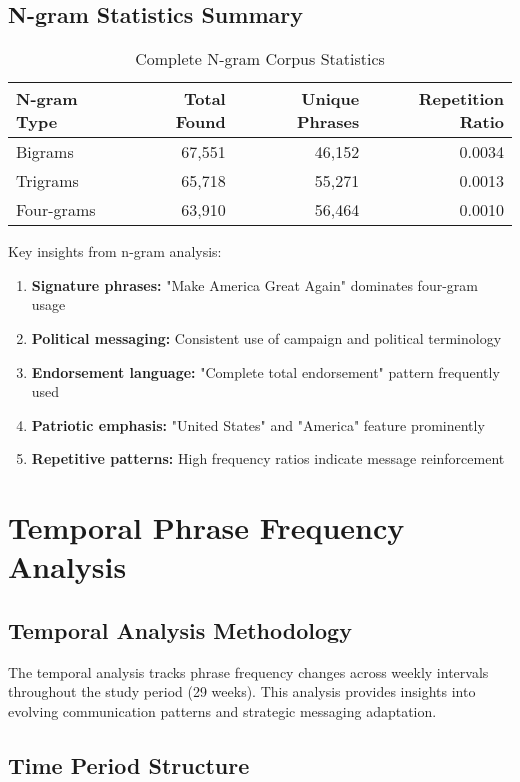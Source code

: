 \documentclass[12pt,a4paper]{article}
\begin{document}
\subsection{N-gram Statistics Summary}

\begin{table}[H]
\centering
\caption{Complete N-gram Corpus Statistics}
\begin{tabular}{@{}lrrr@{}}
\toprule
\textbf{N-gram Type} & \textbf{Total Found} & \textbf{Unique Phrases} & \textbf{Repetition Ratio} \\
\midrule
Bigrams & 67,551 & 46,152 & 0.0034 \\
Trigrams & 65,718 & 55,271 & 0.0013 \\
Four-grams & 63,910 & 56,464 & 0.0010 \\
\bottomrule
\end{tabular}
\end{table}

Key insights from n-gram analysis:
\begin{enumerate}
\item \textbf{Signature phrases:} "Make America Great Again" dominates four-gram usage
\item \textbf{Political messaging:} Consistent use of campaign and political terminology
\item \textbf{Endorsement language:} "Complete total endorsement" pattern frequently used
\item \textbf{Patriotic emphasis:} "United States" and "America" feature prominently
\item \textbf{Repetitive patterns:} High frequency ratios indicate message reinforcement
\end{enumerate}

\section{Temporal Phrase Frequency Analysis}

\subsection{Temporal Analysis Methodology}

The temporal analysis tracks phrase frequency changes across weekly intervals throughout the study period (29 weeks). This analysis provides insights into evolving communication patterns and strategic messaging adaptation.

\subsection{Time Period Structure}
\end{document}
